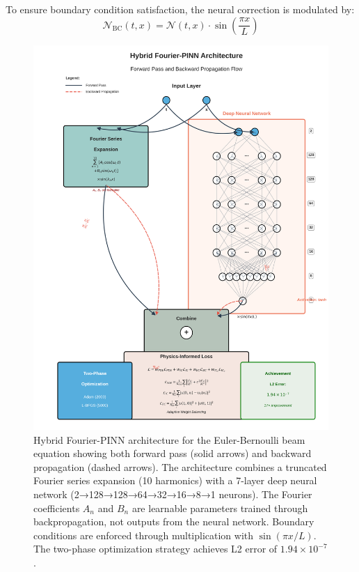 To ensure boundary condition satisfaction, the neural correction is modulated by:
\begin{equation}
\mathcal{N}_{\text{BC}}(t,x) = \mathcal{N}(t,x) \cdot \sin\left(\frac{\pi x}{L}\right)
\end{equation}

\begin{figure}[ht]
    \centering
    \includegraphics[width=0.95\linewidth]{figures/pinn_architecture_diagram.png}
    \caption{Hybrid Fourier-PINN architecture for the Euler-Bernoulli beam equation showing both forward pass (solid arrows) and backward propagation (dashed arrows). The architecture combines a truncated Fourier series expansion (10 harmonics) with a 7-layer deep neural network (2→128→128→64→32→16→8→1 neurons). The Fourier coefficients $A_n$ and $B_n$ are learnable parameters trained through backpropagation, not outputs from the neural network. Boundary conditions are enforced through multiplication with $\sin(\pi x/L)$. The two-phase optimization strategy achieves L2 error of $1.94 \times 10^{-7}$.}
    \label{fig:architecture}
\end{figure}

